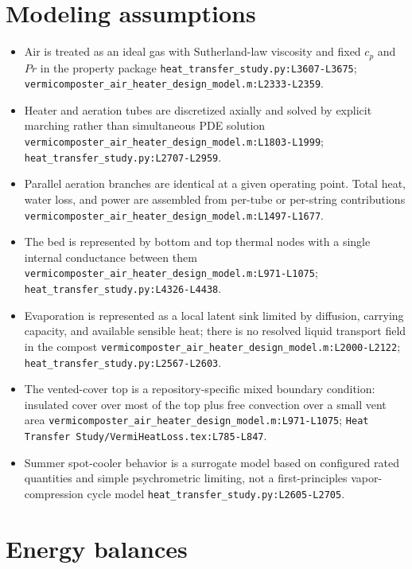 \documentclass[11pt]{article}
\newcommand{\srcref}[1]{\nolinkurl{#1}}
\begin{document}
\section{Modeling assumptions}
\begin{itemize}[leftmargin=*]
\item Air is treated as an ideal gas with Sutherland-law viscosity and fixed \(c_p\) and \(Pr\) in the property package \srcref{heat_transfer_study.py:L3607-L3675}; \srcref{vermicomposter_air_heater_design_model.m:L2333-L2359}.
\item Heater and aeration tubes are discretized axially and solved by explicit marching rather than simultaneous PDE solution \srcref{vermicomposter_air_heater_design_model.m:L1803-L1999}; \srcref{heat_transfer_study.py:L2707-L2959}.
\item Parallel aeration branches are identical at a given operating point. Total heat, water loss, and power are assembled from per-tube or per-string contributions \srcref{vermicomposter_air_heater_design_model.m:L1497-L1677}.
\item The bed is represented by bottom and top thermal nodes with a single internal conductance between them \srcref{vermicomposter_air_heater_design_model.m:L971-L1075}; \srcref{heat_transfer_study.py:L4326-L4438}.
\item Evaporation is represented as a local latent sink limited by diffusion, carrying capacity, and available sensible heat; there is no resolved liquid transport field in the compost \srcref{vermicomposter_air_heater_design_model.m:L2000-L2122}; \srcref{heat_transfer_study.py:L2567-L2603}.
\item The vented-cover top is a repository-specific mixed boundary condition: insulated cover over most of the top plus free convection over a small vent area \srcref{vermicomposter_air_heater_design_model.m:L971-L1075}; \srcref{Heat Transfer Study/VermiHeatLoss.tex:L785-L847}.
\item Summer spot-cooler behavior is a surrogate model based on configured rated quantities and simple psychrometric limiting, not a first-principles vapor-compression cycle model \srcref{heat_transfer_study.py:L2605-L2705}.
\end{itemize}

\section{Energy balances}
\end{document}

